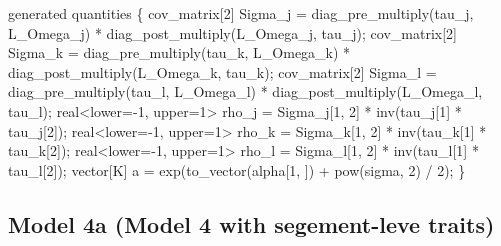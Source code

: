 \documentclass[
  12pt,
  letterpaper,
  DIV=11,
  numbers=noendperiod]{scrartcl}
\newenvironment{Shaded}{\begin{snugshade}}{\end{snugshade}}
\newcommand{\DataTypeTok}[1]{\textcolor[rgb]{0.68,0.00,0.00}{#1}}
\newcommand{\DecValTok}[1]{\textcolor[rgb]{0.68,0.00,0.00}{#1}}
\newcommand{\KeywordTok}[1]{\textcolor[rgb]{0.00,0.23,0.31}{#1}}
\newcommand{\NormalTok}[1]{\textcolor[rgb]{0.00,0.23,0.31}{#1}}
\begin{document}
\begin{Shaded}
\begin{Highlighting}[]
\KeywordTok{generated quantities}\NormalTok{ \{}
  \DataTypeTok{cov\_matrix}\NormalTok{[}\DecValTok{2}\NormalTok{] Sigma\_j = diag\_pre\_multiply(tau\_j, L\_Omega\_j) *}
\NormalTok{    diag\_post\_multiply(L\_Omega\_j\textquotesingle{}, tau\_j);}
  \DataTypeTok{cov\_matrix}\NormalTok{[}\DecValTok{2}\NormalTok{] Sigma\_k = diag\_pre\_multiply(tau\_k, L\_Omega\_k) *}
\NormalTok{    diag\_post\_multiply(L\_Omega\_k\textquotesingle{}, tau\_k);}
  \DataTypeTok{cov\_matrix}\NormalTok{[}\DecValTok{2}\NormalTok{] Sigma\_l = diag\_pre\_multiply(tau\_l, L\_Omega\_l) *}
\NormalTok{    diag\_post\_multiply(L\_Omega\_l\textquotesingle{}, tau\_l);}
  \DataTypeTok{real}\NormalTok{\textless{}}\KeywordTok{lower}\NormalTok{={-}}\DecValTok{1}\NormalTok{, }\KeywordTok{upper}\NormalTok{=}\DecValTok{1}\NormalTok{\textgreater{} rho\_j = Sigma\_j[}\DecValTok{1}\NormalTok{, }\DecValTok{2}\NormalTok{] * inv(tau\_j[}\DecValTok{1}\NormalTok{] * tau\_j[}\DecValTok{2}\NormalTok{]);}
  \DataTypeTok{real}\NormalTok{\textless{}}\KeywordTok{lower}\NormalTok{={-}}\DecValTok{1}\NormalTok{, }\KeywordTok{upper}\NormalTok{=}\DecValTok{1}\NormalTok{\textgreater{} rho\_k = Sigma\_k[}\DecValTok{1}\NormalTok{, }\DecValTok{2}\NormalTok{] * inv(tau\_k[}\DecValTok{1}\NormalTok{] * tau\_k[}\DecValTok{2}\NormalTok{]);}
  \DataTypeTok{real}\NormalTok{\textless{}}\KeywordTok{lower}\NormalTok{={-}}\DecValTok{1}\NormalTok{, }\KeywordTok{upper}\NormalTok{=}\DecValTok{1}\NormalTok{\textgreater{} rho\_l = Sigma\_l[}\DecValTok{1}\NormalTok{, }\DecValTok{2}\NormalTok{] * inv(tau\_l[}\DecValTok{1}\NormalTok{] * tau\_l[}\DecValTok{2}\NormalTok{]);}
  \DataTypeTok{vector}\NormalTok{[K] a = exp(to\_vector(alpha[}\DecValTok{1}\NormalTok{, ]) + pow(sigma, }\DecValTok{2}\NormalTok{) / }\DecValTok{2}\NormalTok{);}
\NormalTok{\}}
\end{Highlighting}
\end{Shaded}

\newpage

\subsection{Model 4a (Model 4 with segement-leve
traits)}\label{model-4a-model-4-with-segement-leve-traits}
\end{document}
